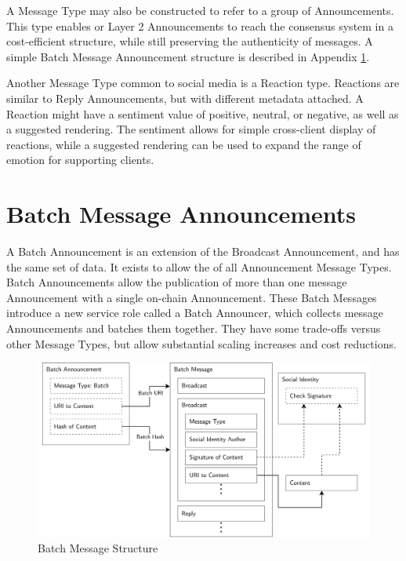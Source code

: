 \documentclass[12pt,letterpaper]{article}
\begin{document}
A Message Type may also be constructed to refer to a group of Announcements. This type
enables  or Layer 2 Announcements to reach the consensus system in a
cost-efficient structure, while still preserving the authenticity of messages. A simple
Batch Message Announcement structure is described in Appendix
\ref{app:batch_message_announcements}.

Another Message Type common to social media is a Reaction type. Reactions are similar to
Reply Announcements, but with different metadata attached. A Reaction might have a sentiment
value of positive, neutral, or negative, as well as a suggested rendering. The sentiment
allows for simple cross-client display of reactions, while a suggested rendering can be used
to expand the range of emotion for supporting clients.

\section{Batch Message Announcements}\label{app:batch_message_announcements}

A Batch Announcement is an extension of the Broadcast Announcement, and has the same
set of data. It exists to allow the  of all Announcement Message
Types. Batch Announcements allow the publication of more than one message
Announcement with a single on-chain Announcement.  These Batch Messages introduce a
new service role called a Batch Announcer, which collects message Announcements and
batches them together. They have some trade-offs versus other Message Types, but
allow substantial scaling increases and cost reductions.

\begin{figure}[h]
	\includegraphics[width=\linewidth]{figures/Batch Message Structure.png}
	\caption{Batch Message Structure}
	\label{fig:9}
\end{figure}
\end{document}
